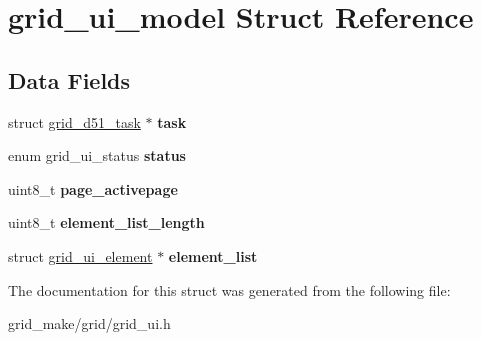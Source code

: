 \hypertarget{structgrid__ui__model}{\section{grid\-\_\-ui\-\_\-model Struct Reference}
\label{structgrid__ui__model}
}
\subsection*{Data Fields}
\begin{DoxyCompactItemize}
\item 
\hypertarget{structgrid__ui__model_acf57a0900600b881eccdfcb8464e7211}{struct \hyperlink{structgrid__d51__task}{grid\-\_\-d51\-\_\-task} $\ast$ {\bfseries task}}\label{structgrid__ui__model_acf57a0900600b881eccdfcb8464e7211}

\item 
\hypertarget{structgrid__ui__model_a153fe786e4e34ea58bf2222f8b95817e}{enum grid\-\_\-ui\-\_\-status {\bfseries status}}\label{structgrid__ui__model_a153fe786e4e34ea58bf2222f8b95817e}

\item 
\hypertarget{structgrid__ui__model_a65a4870f268f9cdad958448dc5f4baf9}{uint8\-\_\-t {\bfseries page\-\_\-activepage}}\label{structgrid__ui__model_a65a4870f268f9cdad958448dc5f4baf9}

\item 
\hypertarget{structgrid__ui__model_a18b2a845fb47208eb3a49b51de15771f}{uint8\-\_\-t {\bfseries element\-\_\-list\-\_\-length}}\label{structgrid__ui__model_a18b2a845fb47208eb3a49b51de15771f}

\item 
\hypertarget{structgrid__ui__model_adcfc480f6bb3fe576f360273b38832ae}{struct \hyperlink{structgrid__ui__element}{grid\-\_\-ui\-\_\-element} $\ast$ {\bfseries element\-\_\-list}}\label{structgrid__ui__model_adcfc480f6bb3fe576f360273b38832ae}

\end{DoxyCompactItemize}


The documentation for this struct was generated from the following file\-:\begin{DoxyCompactItemize}
\item 
grid\-\_\-make/grid/grid\-\_\-ui.\-h\end{DoxyCompactItemize}
